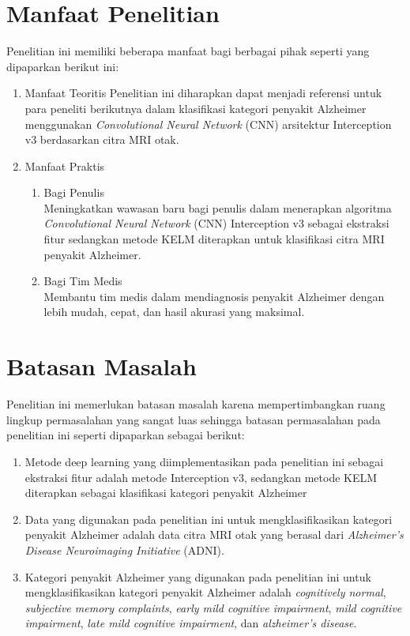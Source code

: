     \section{Manfaat Penelitian}
    Penelitian ini memiliki beberapa manfaat bagi berbagai pihak seperti yang dipaparkan berikut ini:
    \begin{enumerate}
        \item Manfaat Teoritis
        Penelitian ini diharapkan dapat menjadi referensi untuk para peneliti berikutnya dalam klasifikasi kategori penyakit Alzheimer menggunakan \textit{Convolutional Neural Network} (CNN) arsitektur Interception v3 berdasarkan citra MRI otak.

        \item Manfaat Praktis
        \begin{enumerate}
            \item Bagi Penulis\\
            Meningkatkan wawasan baru bagi penulis dalam menerapkan algoritma \textit{Convolutional Neural Network} (CNN) Interception v3 sebagai ekstraksi fitur sedangkan metode KELM diterapkan untuk klasifikasi citra MRI penyakit Alzheimer.

            \item Bagi Tim Medis\\
            Membantu tim medis dalam mendiagnosis penyakit Alzheimer dengan lebih mudah, cepat, dan hasil akurasi yang maksimal.
        \end{enumerate}
    \end{enumerate}

    \section{Batasan Masalah}
    Penelitian ini memerlukan batasan masalah karena mempertimbangkan ruang lingkup permasalahan yang sangat luas sehingga batasan permasalahan pada penelitian ini seperti dipaparkan sebagai berikut:
    \begin{enumerate}
        \item Metode deep learning yang diimplementasikan pada penelitian ini sebagai ekstraksi fitur adalah metode Interception v3, sedangkan metode KELM diterapkan sebagai klasifikasi kategori penyakit Alzheimer
        \item Data yang digunakan pada penelitian ini untuk mengklasifikasikan kategori penyakit Alzheimer adalah data citra MRI otak yang berasal dari \textit{Alzheimer's Disease Neuroimaging Initiative} (ADNI).
        \item Kategori penyakit Alzheimer yang digunakan pada penelitian ini untuk mengklasifikasikan kategori penyakit Alzheimer adalah \textit{cognitively normal}, \textit{subjective memory complaints}, \textit{early mild cognitive impairment}, \textit{mild cognitive impairment}, \textit{late mild cognitive impairment}, dan \textit{alzheimer's disease}.
    \end{enumerate}

